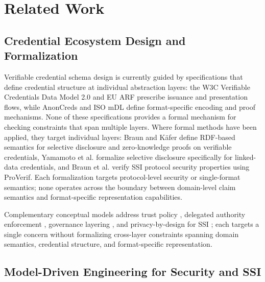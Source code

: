 \section{Related Work}\label{sec:related-work}

\subsection{Credential Ecosystem Design and Formalization}\label{sec:rw-credential}

Verifiable credential schema design is currently guided by specifications that define credential structure at individual abstraction layers: the W3C Verifiable Credentials Data Model 2.0 \citep{sporny_verifiable_2025} and EU \ac{ARF} \citep{noauthor_eu-digital-identity-walleteudi-doc-architecture-and-reference-framework_2026} prescribe issuance and presentation flows, while AnonCreds \citep{curran2022anoncreds} and ISO mDL \citep{_mobile_2021} define format-specific encoding and proof mechanisms. None of these specifications provides a formal mechanism for checking constraints that span multiple layers. Where formal methods have been applied, they target individual layers: Braun and Käfer \citep{curry_rdf-based_2025} define \acl{RDF}-based semantics for selective disclosure and zero-knowledge proofs on verifiable credentials, Yamamoto et al. \citep{yamamoto_formalising_2022} formalize selective disclosure specifically for linked-data credentials, and Braun et al. \citep{braun_ssi_2024} verify SSI protocol security properties using ProVerif. Each formalization targets protocol-level security or single-format semantics; none operates across the boundary between domain-level claim semantics and format-specific representation capabilities.

Complementary conceptual models address trust policy \citep{tith_trust_2025}, delegated authority enforcement \citep{turkanovic_model_2025}, governance layering \citep{davie_trust_2019}, and privacy-by-design for SSI \citep{naghmouchi_systematic_2025}; each targets a single concern without formalizing cross-layer constraints spanning domain semantics, credential structure, and format-specific representation.

\subsection{Model-Driven Engineering for Security and SSI}\label{sec:rw-mde}

